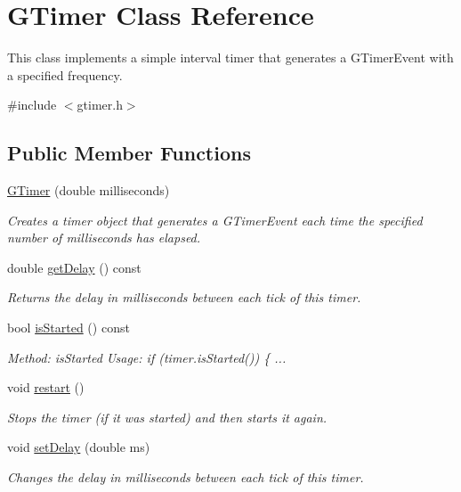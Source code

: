 \hypertarget{classGTimer}{}\section{G\+Timer Class Reference}
\label{classGTimer}


This class implements a simple interval timer that generates a {\ttfamily G\+Timer\+Event} with a specified frequency.  




{\ttfamily \#include $<$gtimer.\+h$>$}

\subsection*{Public Member Functions}
\begin{DoxyCompactItemize}
\item 
\mbox{\hyperlink{classGTimer_ab947e096ce76b63f283502e4b4446810}{G\+Timer}} (double milliseconds)
\begin{DoxyCompactList}\small\item\em Creates a timer object that generates a {\ttfamily G\+Timer\+Event} each time the specified number of milliseconds has elapsed. \end{DoxyCompactList}\item 
double \mbox{\hyperlink{classGTimer_a73d6fbcedb3f4c8379a76161503dc8f8}{get\+Delay}} () const
\begin{DoxyCompactList}\small\item\em Returns the delay in milliseconds between each tick of this timer. \end{DoxyCompactList}\item 
bool \mbox{\hyperlink{classGTimer_ac1991ea0e286fbb461b60c8c9299d781}{is\+Started}} () const
\begin{DoxyCompactList}\small\item\em Method\+: is\+Started Usage\+: if (timer.\+is\+Started()) \{ ... \end{DoxyCompactList}\item 
void \mbox{\hyperlink{classGTimer_a22ee094ca3f45aa4156b97d34fe678bf}{restart}} ()
\begin{DoxyCompactList}\small\item\em Stops the timer (if it was started) and then starts it again. \end{DoxyCompactList}\item 
void \mbox{\hyperlink{classGTimer_acebfcbc48c6acd460dac117a8f71a92f}{set\+Delay}} (double ms)
\begin{DoxyCompactList}\small\item\em Changes the delay in milliseconds between each tick of this timer. \end{DoxyCompactList}\item 

\end{DoxyCompactItemize}
